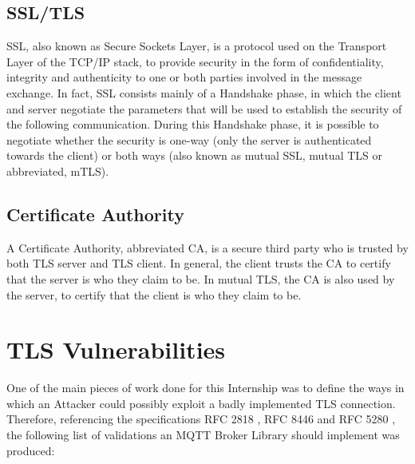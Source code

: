 \documentclass[binding=0.6cm,noexaminfo]{sapthesis}
\begin{document}
\subsection{SSL/TLS}
SSL, also known as Secure Sockets Layer, is a protocol used on the Transport Layer of the TCP/IP stack, to provide security in the form of confidentiality, integrity and authenticity to one or both parties involved in the message exchange. In fact, SSL consists mainly of a Handshake phase, in which the client and server negotiate the parameters that will be used to establish the security of the following communication. During this Handshake phase, it is possible to negotiate whether the security is one-way (only the server is authenticated towards the client) or both ways (also known as mutual SSL, mutual TLS or abbreviated, mTLS).

\subsection{Certificate Authority}
A Certificate Authority, abbreviated CA, is a secure third party who is trusted by both TLS server and TLS client. In general, the client trusts the CA to certify that the server is who they claim to be. In mutual TLS, the CA is also used by the server, to certify that the client is who they claim to be.

\section{TLS Vulnerabilities}
One of the main pieces of work done for this Internship was to define the ways in which an Attacker could possibly exploit a badly implemented TLS connection. Therefore, referencing the specifications RFC 2818 \cite{rfc2818}, RFC 8446 \cite{rfc8446} and RFC 5280 \cite{rfc5280}, the following list of validations an MQTT Broker Library should implement was produced:
\end{document}
